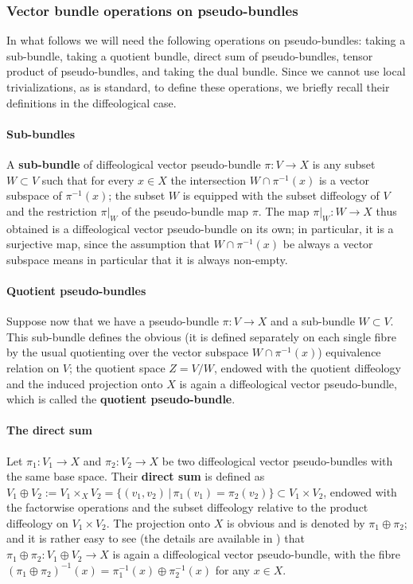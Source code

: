 \documentclass{article}
\begin{document}
\subsubsection{Vector bundle operations on pseudo-bundles}

In what follows we will need the following operations on pseudo-bundles: taking a sub-bundle, taking a quotient bundle, direct sum of pseudo-bundles, tensor product of pseudo-bundles, and taking the 
dual bundle. Since we cannot use local trivializations, as is standard, to define these operations, we briefly recall their definitions in the diffeological case.

\paragraph{Sub-bundles} A \textbf{sub-bundle} of diffeological vector pseudo-bundle $\pi:V\to X$ is any subset $W\subset V$ such that for every $x\in X$ the intersection $W\cap\pi^{-1}(x)$ is a vector 
subspace of $\pi^{-1}(x)$; the subset $W$ is equipped with the subset diffeology of $V$ and the restriction $\pi|_W$ of the pseudo-bundle map $\pi$. The map $\pi|_W:W\to X$ thus obtained is a
diffeological vector pseudo-bundle on its own; in particular, it is a surjective map, since the assumption that $W\cap\pi^{-1}(x)$ be always a vector subspace means in particular that it is always non-empty.

\paragraph{Quotient pseudo-bundles} Suppose now that we have a pseudo-bundle $\pi:V\to X$ and a sub-bundle $W\subset V$. This sub-bundle defines the obvious (it is defined separately on each
single fibre by the usual quotienting over the vector subspace $W\cap\pi^{-1}(x)$) equivalence relation on $V$; the quotient space $Z=V/W$, endowed with the quotient diffeology and the induced
projection onto $X$ is again a diffeological vector pseudo-bundle, which is called the \textbf{quotient pseudo-bundle}.

\paragraph{The direct sum} Let $\pi_1:V_1\to X$ and $\pi_2:V_2\to X$ be two diffeological vector pseudo-bundles with the same base space. Their \textbf{direct sum} is defined as 
$V_1\oplus V_2:=V_1\times_X V_2=\{(v_1,v_2)\,|\,\pi_1(v_1)=\pi_2(v_2)\}\subset V_1\times V_2$, endowed with the factorwise operations and the subset diffeology relative to the product diffeology on 
$V_1\times V_2$. The projection onto $X$ is obvious and is denoted by $\pi_1\oplus\pi_2$; and it is rather easy to see (the details are available in \cite{vincent}) that $\pi_1\oplus\pi_2:V_1\oplus V_2\to X$ 
is again a diffeological vector pseudo-bundle, with the fibre $(\pi_1\oplus\pi_2)^{-1}(x)=\pi_1^{-1}(x)\oplus\pi_2^{-1}(x)$ for any $x\in X$.
\end{document}
